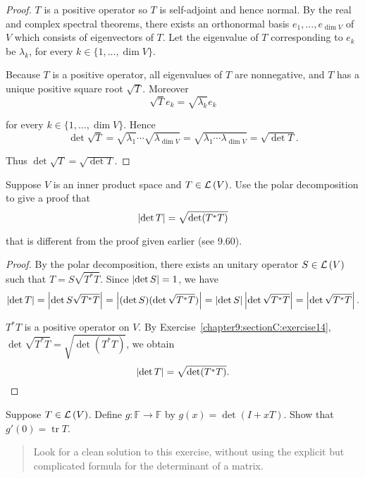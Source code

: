 \begin{proof}
    $T$ is a positive operator so $T$ is self-adjoint and hence normal. By the real and complex spectral theorems, there exists an orthonormal basis $e_{1}, \ldots, e_{\dim V}$ of $V$ which consists of eigenvectors of $T$. Let the eigenvalue of $T$ corresponding to $e_{k}$ be $\lambda_{k}$, for every $k\in\{1,\ldots,\dim V\}$.

    Because $T$ is a positive operator, all eigenvalues of $T$ are nonnegative, and $T$ has a unique positive square root $\sqrt{T}$. Moreover
    \[
        \sqrt{T}e_{k} = \sqrt{\lambda_{k}}e_{k}
    \]

    for every $k\in\{1,\ldots,\dim V\}$. Hence
    \[
        \det\sqrt{T} = \sqrt{\lambda_{1}}\cdots\sqrt{\lambda_{\dim V}} = \sqrt{\lambda_{1}\cdots\lambda_{\dim V}} = \sqrt{\det T}.
    \]

    Thus $\det\sqrt{T} = \sqrt{\det T}$.
\end{proof}
\newpage

\begin{exercise}\label{chapter9:sectionC:exercise15}
    Suppose $V$ is an inner product space and $T\in\mathcal{L}\left({V}\right)$. Use the polar decomposition to give a proof that
    \[
        \left\vert{\det T}\right\vert = \sqrt{\det(T^{*}T)}
    \]

    that is different from the proof given earlier (see 9.60).
\end{exercise}

\begin{proof}
    By the polar decomposition, there exists an unitary operator $S\in\mathcal{L}\left({V}\right)$ such that $T = S\sqrt{T^{*}T}$. Since $\left\vert{\det S}\right\vert = 1$, we have
    \[
        \left\vert{\det T}\right\vert = \left\vert{\det S\sqrt{T^{*}T}}\right\vert = \left\vert{(\det S)(\det\sqrt{T^{*}T})}\right\vert = \left\vert{\det S}\right\vert\left\vert{\det\sqrt{T^{*}T}}\right\vert = \left\vert{\det\sqrt{T^{*}T}}\right\vert.
    \]

    $T^{*}T$ is a positive operator on $V$. By Exercise~\ref{chapter9:sectionC:exercise14}, $\det\sqrt{T^{*}T} = \sqrt{\det(T^{*}T)}$, we obtain
    \[
        \left\vert{\det T}\right\vert = \sqrt{\det(T^{*}T)}.
    \]
\end{proof}
\newpage

\begin{exercise}\label{chapter9:sectionC:exercise16}
    Suppose $T\in\mathcal{L}\left({V}\right)$. Define $g: \mathbb{F}\to\mathbb{F}$ by $g(x) = \det(I + xT)$. Show that $g'(0) = \operatorname{tr}T$.
\end{exercise}

\begin{quote}
    Look for a clean solution to this exercise, without using the explicit but complicated formula for the determinant of a matrix.
\end{quote}

